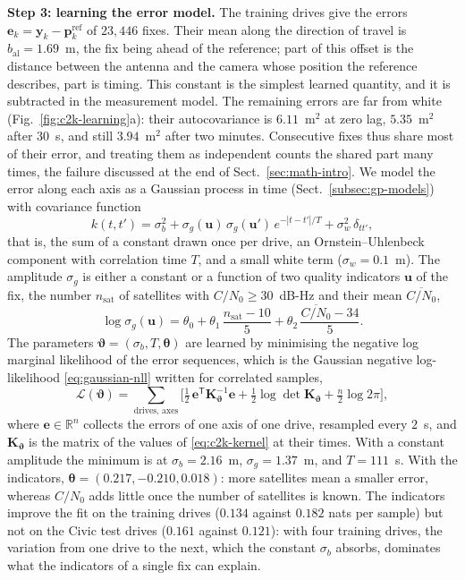 \textbf{Step 3: learning the error model.} The training drives give the errors $\mathbf{e}_k=\mathbf{y}_k-\mathbf{p}^{\mathrm{ref}}_k$ of $23{,}446$ fixes. Their mean along the direction of travel is $b_{\mathrm{al}}=1.69$~m, the fix being ahead of the reference; part of this offset is the distance between the antenna and the camera whose position the reference describes, part is timing. This constant is the simplest learned quantity, and it is subtracted in the measurement model. The remaining errors are far from white (Fig.~\ref{fig:c2k-learning}a): their autocovariance is $6.11$~m$^{2}$ at zero lag, $5.35$~m$^{2}$ after $30$~s, and still $3.94$~m$^{2}$ after two minutes. Consecutive fixes thus share most of their error, and treating them as independent counts the shared part many times, the failure discussed at the end of Sect.~\ref{sec:math-intro}. We model the error along each axis as a Gaussian process in time (Sect.~\ref{subsec:gp-models}) with covariance function
\begin{equation}
k(t,t')=\sigma_b^{2}+\sigma_g(\mathbf{u})\,\sigma_g(\mathbf{u}')\,e^{-|t-t'|/T}+\sigma_w^{2}\,\delta_{tt'},
\label{eq:c2k-kernel}
\end{equation}
that is, the sum of a constant drawn once per drive, an Ornstein--Uhlenbeck component with correlation time $T$, and a small white term ($\sigma_w=0.1$~m). The amplitude $\sigma_g$ is either a constant or a function of two quality indicators $\mathbf{u}$ of the fix, the number $n_{\mathrm{sat}}$ of satellites with $C/N_0\ge30$~dB-Hz and their mean $\overline{C/N_0}$,
\begin{equation}
\log\sigma_g(\mathbf{u})=\theta_0+\theta_1\,\frac{n_{\mathrm{sat}}-10}{5}+\theta_2\,\frac{\overline{C/N_0}-34}{5}.
\label{eq:c2k-features}
\end{equation}
The parameters $\boldsymbol{\vartheta}=(\sigma_b,T,\boldsymbol{\theta})$ are learned by minimising the negative log marginal likelihood of the error sequences, which is the Gaussian negative log-likelihood \eqref{eq:gaussian-nll} written for correlated samples,
\begin{equation}
\mathcal{L}(\boldsymbol{\vartheta})=\sum_{\text{drives, axes}}\Big[\tfrac12\,\mathbf{e}^{\mathsf T}\mathbf{K}_{\boldsymbol{\vartheta}}^{-1}\mathbf{e}+\tfrac12\log\det\mathbf{K}_{\boldsymbol{\vartheta}}+\tfrac{n}{2}\log 2\pi\Big],
\label{eq:c2k-marginal}
\end{equation}
where $\mathbf{e}\in\mathbb{R}^{n}$ collects the errors of one axis of one drive, resampled every $2$~s, and $\mathbf{K}_{\boldsymbol{\vartheta}}$ is the matrix of the values of \eqref{eq:c2k-kernel} at their times. With a constant amplitude the minimum is at $\sigma_b=2.16$~m, $\sigma_g=1.37$~m, and $T=111$~s. With the indicators, $\boldsymbol{\theta}=(0.217,-0.210,0.018)$: more satellites mean a smaller error, whereas $C/N_0$ adds little once the number of satellites is known. The indicators improve the fit on the training drives ($0.134$ against $0.182$ nats per sample) but not on the Civic test drives ($0.161$ against $0.121$): with four training drives, the variation from one drive to the next, which the constant $\sigma_b$ absorbs, dominates what the indicators of a single fix can explain.

